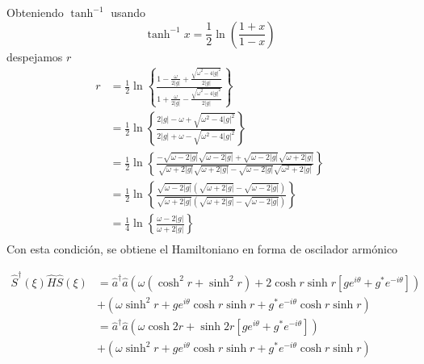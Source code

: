 Obteniendo $\tanh^{-1}$ usando
\begin{equation*}
  \tanh^{-1}{x} = \frac{1}{2}\ln{\left( \frac{1+x}{1-x} \right)}
\end{equation*}
despejamos $r$
\begin{align*}
  r & =\frac{1}{2} \ln \left\{ \frac{\displaystyle{1 - \frac{\omega}{2\vert g\vert} + \frac{\sqrt{\omega^{2}-4\vert g\vert^{2}}}{2\vert g\vert}}}{\displaystyle{1+ \frac{\omega}{2\vert g\vert} - \frac{\sqrt{\omega^{2}-4\vert g\vert^{2}}}{2\vert g\vert}}} \right\}                         \\
    & =  \frac{1}{2} \ln \left\{ \frac{2\vert g \vert -\omega + \sqrt{\omega^{2}-4\vert g\vert^{2}}}{2\vert g \vert + \omega - \sqrt{\omega^{2}-4\vert g\vert^{2}}} \right\}                                                                                                                   \\
    & =  \frac{1}{2} \ln \left\{ \frac{-\sqrt{\omega - 2\vert g\vert}\sqrt{\omega - 2\vert g\vert} + \sqrt{\omega-2\vert g\vert}\sqrt{\omega+2\vert g\vert}}{\sqrt{\omega + 2\vert g\vert}\sqrt{\omega + 2\vert g\vert} - \sqrt{\omega-2\vert g\vert}\sqrt{\omega^{2}+2\vert g\vert}} \right\} \\
    & =  \frac{1}{2} \ln \left\{ \frac{\sqrt{\omega - 2\vert g\vert}\left(\sqrt{\omega + 2\vert g\vert} - \sqrt{\omega-2\vert g\vert}\right)}{\sqrt{\omega + 2\vert g\vert}\left(\sqrt{\omega + 2\vert g\vert} - \sqrt{\omega-2\vert g\vert}\right)} \right\}                                  \\
    & =  \frac{1}{4} \ln \left\{ \frac{\omega - 2\vert g\vert}{\omega + 2\vert g\vert} \right\}                                                                                                                                                                                                \\
\end{align*}
Con esta condición, se obtiene el Hamiltoniano en forma de oscilador armónico

\begin{align*}
  \hat{S}^{\dagger}(\xi) \hat{H} \hat{S}(\xi) & = \hat{a}^{\dagger}\hat{a} \left( \omega (\cosh^2 {r} + \sinh^2 {r}) + 2\cosh{r}\sinh{r} \left[ g e^{i\theta} + g^{*} e^{-i\theta} \right] \right) \\
                                              & + \left( \omega \sinh^2 {r} + g e^{i\theta}\cosh{r}\sinh{r} + g^{*}e^{-i\theta}\cosh{r}\sinh{r} \right)                                            \\
                                              & = \hat{a}^{\dagger}\hat{a} \left( \omega \cosh{2r} + \sinh{2r} \left[ g e^{i\theta} + g^{*} e^{-i\theta} \right] \right)                           \\
                                              & + \left( \omega \sinh^2 {r} + g e^{i\theta}\cosh{r}\sinh{r} + g^{*}e^{-i\theta}\cosh{r}\sinh{r} \right)                                            \\
\end{align*}


